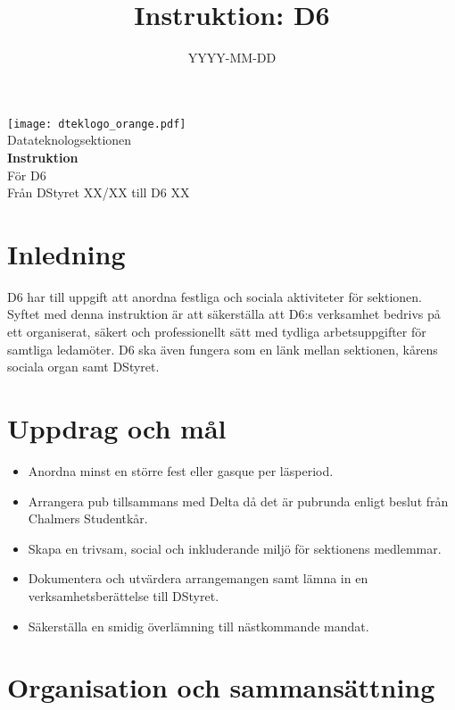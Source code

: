 \documentclass[a4paper]{dtekinstruktion}
\title{Instruktion: D6}
\date{YYYY-MM-DD}
\begin{document}
\begin{titlepage}
  \thispagestyle{empty} %
  \vspace*{1cm}
  \begin{center}
    \texttt{[image: dteklogo\_orange.pdf]}\\[3em]
    {\Huge Datateknologsektionen}\\[3em]
    {\Huge \textbf{Instruktion}}\\[1em]
    {\Huge För D6}\\[3em]
    Från DStyret XX/XX till D6 XX
  \end{center}
\end{titlepage}

\makeheadfoot

\tableofcontents

\section{Inledning}
D6 har till uppgift att anordna festliga och sociala aktiviteter för sektionen. Syftet med denna instruktion är att säkerställa att D6:s verksamhet bedrivs på ett organiserat, säkert och professionellt sätt med tydliga arbetsuppgifter för samtliga ledamöter. D6 ska även fungera som en länk mellan sektionen, kårens sociala organ samt DStyret.

\section{Uppdrag och mål}
\begin{itemize}
  \item Anordna minst en större fest eller gasque per läsperiod.
  \item Arrangera pub tillsammans med Delta då det är pubrunda enligt beslut från Chalmers Studentkår.
  \item Skapa en trivsam, social och inkluderande miljö för sektionens medlemmar.
  \item Dokumentera och utvärdera arrangemangen samt lämna in en verksamhetsberättelse till DStyret.
  \item Säkerställa en smidig överlämning till nästkommande mandat.
\end{itemize}

\section{Organisation och sammansättning}
\end{document}
